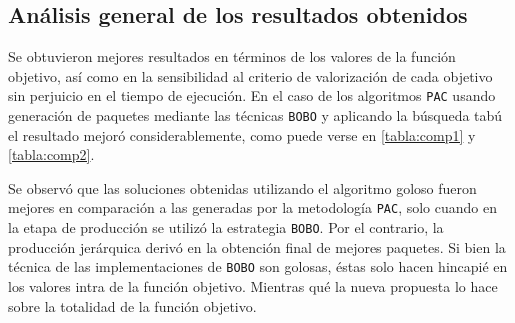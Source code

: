 \begin{table}[H]
\begin{center}
\caption{Comparación de calidad de soluciones entre algoritmos para la \hyperref[busqueda:atracciones]{búsqueda de atracciones turísticas}}
\end{center}
\end{table}

\subsection{Análisis general de los resultados obtenidos}
Se obtuvieron mejores resultados en términos de los valores de la función objetivo, así como en la sensibilidad al criterio de valorización de cada objetivo sin perjuicio en el tiempo de ejecución. En el caso de los algoritmos \texttt{PAC} usando generación de paquetes mediante las técnicas \texttt{BOBO} y aplicando la búsqueda tabú el resultado mejoró considerablemente, como puede verse en \autoref{tabla:comp1} y \autoref{tabla:comp2}.

Se observó que las soluciones obtenidas utilizando el algoritmo goloso fueron mejores en comparación a las generadas por la metodología \texttt{PAC}, solo cuando en la etapa de producción se utilizó la estrategia \texttt{BOBO}. Por el contrario, la producción jerárquica derivó en la obtención final de mejores paquetes. Si bien la técnica de las implementaciones de \texttt{BOBO} son golosas, éstas solo hacen hincapié en los valores intra de la función objetivo. Mientras qué la nueva propuesta lo hace sobre la totalidad de la función objetivo. 

